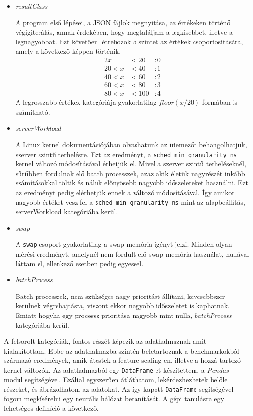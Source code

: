 \begin{itemize}
\item \textit{resultClass}

A program első lépései, a JSON fájlok megnyitása, az értékeken történő végigiterálás, annak érdekében, hogy megtaláljam a legkisebbet, illetve a legnagyobbat. Ezt követően létrehozok 5 szintet az értékek csoportosítására, amely a következő képpen történik.
\begin{alignat*}{2}
         x& < 20 &: 0 \\
    20 < x& < 40 &: 1 \\
    40 < x& < 60 &: 2 \\
    60 < x& < 80 &: 3 \\
    80 < x& < 100&: 4
\end{alignat*}
A legrosszabb értékek kategóriája gyakorlatilag $floor(x / 20)$ formában is számítható.

\item \textit{serverWorkload}

A Linux kernel dokumentációjában olvashatunk az ütemezőt behangolhatjuk, szerver szintű terhelésre. Ezt az eredményt, a \texttt{sched\_min\_granularity\_ns} kernel változó módosításával érhetjük el.
Mivel a szerver szintű terheléseknél, sűrűbben fordulnak elő batch processzek, azaz akik életük nagyrészét inkább számításokkal töltik és náluk előnyösebb nagyobb időszeleteket használni. Ezt az eredményt pedig elérhetjük ennek a változó módosításával. Így amikor nagyobb értéket vesz fel a \texttt{sched\_min\_granularity\_ns} mint az alapbeállítás, serverWorkload kategóriába kerül.
\item \textit{swap} 

A \texttt{swap} csoport gyakorlatilag a swap memória igényt jelzi. 
Minden olyan mérési eredményt, amelynél nem fordult elő swap memória használat, nullával láttam el, ellenkező esetben pedig egyessel.
\item \textit{batchProcess}

Batch processzek, nem szükséges nagy prioritást állítani, kevesebbszer kerülnek végrehajtásra, viszont ekkor nagyobb időszeletet is kaphatnak. Emiatt hogyha egy processz prioritása nagyobb mint nulla, \textit{batchProcess} kategóriába kerül.
\end{itemize}

A felsorolt kategóriák, fontos részét képezik az adathalmaznak amit kialakítottam. Ebbe az adathalmazba szintén beletartoznak a benchmarkokból származó eredmények, amik átestek a feature scaling-en, illetve a hozzá tartozó kernel változók. Az adathalmazból egy \texttt{DataFrame}-et készítettem, a \textit{Pandas} modul segítségével. Ezáltal egyszerűen átláthatom, lekérdezhezhetek belőle részeket, és ábrázolhatom az adatokat.
Az így kapott \texttt{DataFrame} segítségével fogom megkísérelni egy neurális hálózat betanítását. 
A gépi tanulásra egy lehetséges definíció a következő.

